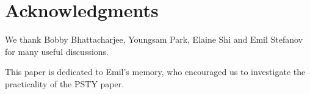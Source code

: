 \documentclass{sig-alternate-2013}
\begin{document}
\newcommand{\algProbGenPr}{\textsf{\small \emph{ProbGen}}}
\newcommand{\algComputePr}{\textsf{\small \emph{PrivateCompute}}}
\newcommand{\algVerifyPr}{\textsf{\small \emph{Verify}}}
\newcommand{\algSetupPr}{\textsf{\small \emph{Setup}}}
\newcommand{\algKeyGenPr}{\textsf{\small \emph{KeyGen}}}
\newcommand{\algQueryKeyGenPr}{\textsf{\small \emph{QueryKeyGen}}}




\newcommand{\algProbGenPlain}{\textsf{\small ProbGen}}
\newcommand{\algComputePlain}{\textsf{\small Compute}}
\newcommand{\algChalPlain}{\textsf{\small Challenge}}
\newcommand{\algVerifyPlain}{\textsf{\small Verify}}
\newcommand{\algUpdatePlain}{\textsf{\small Update}}
\newcommand{\algSetupPlain}{\textsf{\small Setup}}
\newcommand{\algKeyGenPlain}{\textsf{\small KeyGen}}
\newcommand{\algRefreshPlain}{\textsf{\small Refresh}}

\newcommand{\PKq}{\mathsf{pk}}
\newcommand{\PK}{\mathsf{PK}}
\newcommand{\SKq}{\mathsf{sk}}
\newcommand{\SK}{\mathsf{SK}}
\newcommand{\VK}{\mathsf{FK}}
\newcommand{\VI}{\mathsf{FK}}
\newcommand{\state}{\mathsf{state}}

\newcommand{\params}{\mathsf{params}}
\newcommand{\sigsk}{\Sigma.\mathsf{sk}}
\newcommand{\sigvk}{\Sigma.\mathsf{pk}}
\newcommand{\msg}{\mathsf{msg}}
\newcommand{\sigKeyGen}{\Sigma.\mathsf{Key}}
\newcommand{\sigSign}{\Sigma.\mathsf{Sign}}
\newcommand{\sigVerify}{\Sigma.\mathsf{Ver}}

\maketitle












%




\section*{Acknowledgments} We thank Bobby Bhattacharjee, Youngsam Park, Elaine Shi and Emil Stefanov for many useful discussions. 

This paper is dedicated to Emil's memory, who encouraged us to investigate the practicality of the PSTY paper.
%
%

\end{document}
